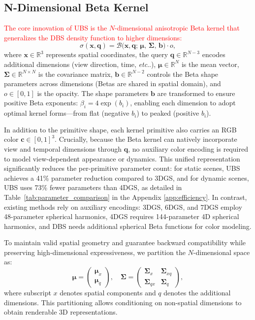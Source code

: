 \documentclass{article} %
\makeatletter
\DeclareRobustCommand\onedot{\futurelet\@let@token\@onedot}
\def\@onedot{\ifx\@let@token.\else.\null\fi\xspace}
\def\etc{\emph{etc}\onedot} \def\vs{\emph{vs}\onedot}
\makeatother
\begin{document}
\subsection{N-Dimensional Beta Kernel}
\label{sec:method_n_beta_kernal}
\textcolor{red}{The core innovation of UBS is the $N$-dimensional anisotropic Beta kernel that generalizes the DBS density function to higher dimensions:}
\begin{equation}
\sigma(\bm{x}, \bm{q}) = \mathcal{B}\bigl(\bm{x}, \bm{q};\,\bm{\mu},\,\bm{\Sigma},\,\bm{b}\bigr) \cdot o,
\end{equation}
where $\bm{x}\in\mathbb{R}^3$ represents spatial coordinates, the query $\bm{q}\in\mathbb{R}^{N-3}$ encodes additional dimensions (view direction, time, \etc), $\bm{\mu}\in\mathbb{R}^{N}$ is the mean vector, $\bm{\Sigma}\in\mathbb{R}^{N\times N}$ is the covariance matrix, $\bm{b}\in\mathbb{R}^{N-2}$ controls the Beta shape parameters across dimensions (Betas are shared in spatial domain), and $o \in [0,1]$ is the opacity. The shape parameters $\bm{b}$ are transformed to ensure positive Beta exponents: $\beta_i = 4\exp(b_i)$, enabling each dimension to adopt optimal kernel forms—from flat (negative $b_i$) to peaked (positive $b_i$).

In addition to the primitive shape, each kernel primitive also carries an RGB color $\bm{c}\in[0,1]^3$. Crucially, because the Beta kernel can natively incorporate view and temporal dimensions through $\bm{q}$, no auxiliary color encoding is required to model view-dependent appearance or dynamics. This unified representation significantly reduces the per-primitive parameter count: for static scenes, UBS achieves a 41\% parameter reduction compared to 3DGS, and for dynamic scenes, UBS uses 73\% fewer parameters than 4DGS, as detailed in Table~\ref{tab:parameter_comparison} in the Appendix \ref{app:efficiency}. In contrast, existing methods rely on auxiliary encodings: 3DGS, 6DGS, and 7DGS employ 48-parameter spherical harmonics, 4DGS requires 144-parameter 4D spherical harmonics, and DBS needs additional spherical Beta functions for color modeling.

To maintain valid spatial geometry and guarantee backward compatibility while preserving high-dimensional expressiveness, we partition the $N$-dimensional space as:
\begin{equation}
\bm{\mu}=
\begin{pmatrix}
\bm{\mu}_x \\
\bm{\mu}_q           
\end{pmatrix}, \quad
\bm{\Sigma}=
\begin{pmatrix}
\bm{\Sigma}_x      &\bm{\Sigma}_{xq} \\
\bm{\Sigma}_{qx} & \bm{\Sigma}_q          
\end{pmatrix},
\end{equation}
where subscript $x$ denotes spatial components and $q$ denotes the additional dimensions. This partitioning allows conditioning on non-spatial dimensions to obtain renderable 3D representations.
\end{document}
